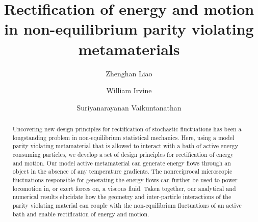 \documentclass[
 preprint,
 preprintnumbers,
 amsmath,amssymb,
 aps,
 pre,
 longbibliography,
 superscriptaddress,
 10pt, twocolumn
]{revtex4-1}
\begin{document}
\newcommand{\eqnname}{Eq.}
\newcommand{\secname}{Sec.}


\title{Rectification of energy and motion in non-equilibrium parity violating metamaterials}


\author{Zhenghan Liao}
\author{William Irvine}
\author{Suriyanarayanan Vaikuntanathan}


\begin{abstract}
Uncovering new design principles for rectification of stochastic fluctuations has been a longstanding problem in non-equilibrium statistical mechanics. Here, using a model parity violating metamaterial that is allowed to interact with a bath of active energy consuming particles, we develop a set of design principles for rectification of energy and motion. Our model active metamaterial can generate energy flows through an object in the absence of any temperature gradients. The nonreciprocal microscopic fluctuations responsible for generating the energy flows can further be used to power locomotion in, or exert forces on, a viscous fluid. Taken together, our analytical and numerical results elucidate how the geometry and inter-particle interactions of the parity violating material can couple with the non-equilibrium fluctuations of an active bath and enable rectification of energy and motion.  
\end{abstract}

\maketitle
\end{document}
